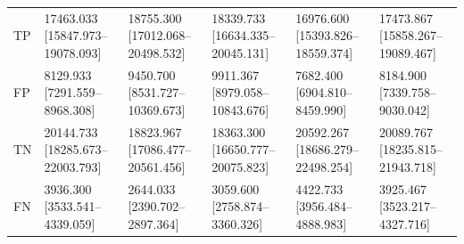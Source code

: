 \begin{tabular}{llllll}
TP & 17463.033 [15847.973--19078.093] & 18755.300 [17012.068--20498.532] & 18339.733 [16634.335--20045.131] & 16976.600 [15393.826--18559.374] & 17473.867 [15858.267--19089.467] \\
FP & 8129.933 [7291.559--8968.308] & 9450.700 [8531.727--10369.673] & 9911.367 [8979.058--10843.676] & 7682.400 [6904.810--8459.990] & 8184.900 [7339.758--9030.042] \\
TN & 20144.733 [18285.673--22003.793] & 18823.967 [17086.477--20561.456] & 18363.300 [16650.777--20075.823] & 20592.267 [18686.279--22498.254] & 20089.767 [18235.815--21943.718] \\
FN & 3936.300 [3533.541--4339.059] & 2644.033 [2390.702--2897.364] & 3059.600 [2758.874--3360.326] & 4422.733 [3956.484--4888.983] & 3925.467 [3523.217--4327.716] \\
\bottomrule
\end{tabular}
